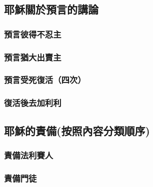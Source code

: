 
\subsection{耶穌關於預言的講論}
\subsubsection{預言彼得不忍主}
\subsubsection{預言猶大出賣主}
 \subsubsection{預言受死復活（四次）}
 \subsubsection{復活後去加利利}
 

\subsection{耶穌的責備(按照內容分類順序)}
 \subsubsection{責備法利賽人}
\subsubsection{責備門徒}
 
 







